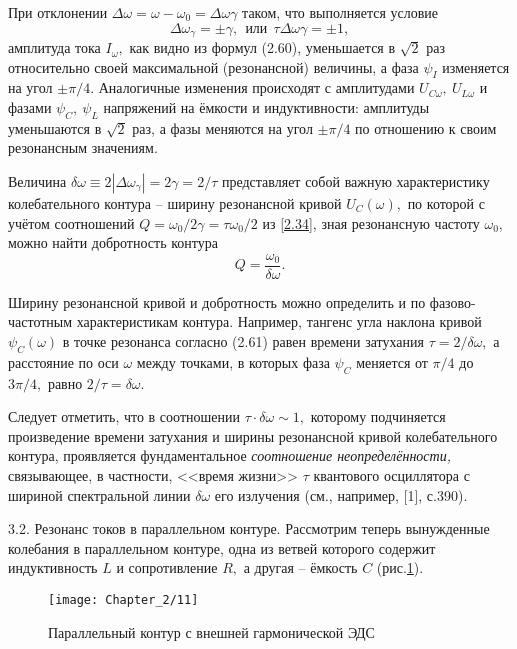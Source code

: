 {При отклонении $\Delta\omega=\omega-\omega_0=\Delta\omega{\gamma}$ таком, что выполняется условие
\setcounter{equation}{61}
\begin{equation}\label{2.62}
\Delta\omega_{\gamma}=\pm\gamma,~~\text{или}~~\tau\Delta\omega{\gamma}=\pm1,
\end{equation}
амплитуда тока $I_{\omega},$ как видно из формул (2.60), уменьшается в $\sqrt{2}$ раз относительно своей мак\-симальной (резонансной) величины, а фаза $\psi_I$ изменяется на угол $\pm\pi/4.$ Аналогичные измене\-ния происходят с амплитудами $U_{C\omega},~U_{L\omega}$ и фазами $\psi_C,~\psi_L$   напряжений на ёмкости и индук\-тивности: амплитуды уменьшаются в $\sqrt{2}$ раз, а фазы меняются на угол $\pm\pi/4$ по отношению к своим резонансным значениям.

Величина $\delta\omega\equiv2|\Delta\omega_{\gamma}|=2\gamma=2/\tau$ представляет собой важную характеристику ко\-ле\-ба\-тель\-ного контура – \textsf{ширину резонансной кривой} $U_C(\omega),$ по которой с учётом соотношений $Q=\omega_0/2\gamma=\tau\omega_0/2$ из \eqref{2.34}, зная резонансную частоту $\omega_0$, можно найти добротность контура
\begin{equation}\label{2.63}
Q=\dfrac{\omega_0}{\delta\omega}.
\end{equation}

Ширину резонансной кривой и добротность можно определить и по фазово-частотным ха\-рактеристикам контура. Например, тангенс угла наклона кривой $\psi_C(\omega)$ в точке резонанса со\-гласно (2.61) равен времени затухания $\tau=2/\delta\omega,$ а расстояние по оси $\omega$ между точками, в которых фаза $\psi_C$ меняется от $\pi/4$ до $3\pi/4,$ равно $2/\tau=\delta\omega.$

Следует отметить, что в соотношении $\tau\cdot\delta\omega\sim1,$ которому подчиняется произведение вре\-мени затухания и ширины резонансной кривой колебательного контура, проявляется фундаментальное \emph{соотношение неопределённости,} связывающее, в частности, <<время жизни>> $\tau$ квантового осциллятора с шириной спектральной линии $\delta\omega$ его излучения (см., например, [1], с.390).

\textsf{3.2. Резонанс токов в параллельном контуре.} Рассмотрим теперь вынужденные колебания в параллельном контуре, одна из ветвей которого содержит индуктивность $L$ и сопротивление $R,$ а другая – ёмкость $C$ (рис.\ref{fig7}).
\begin{center}
	\begin{figure}[h!]
		\centering\texttt{[image: Chapter\_2/11]}
		\caption{Параллельный контур с внешней гармонической ЭДС}
		\label{fig7}
	\end{figure}
\end{center}

}
